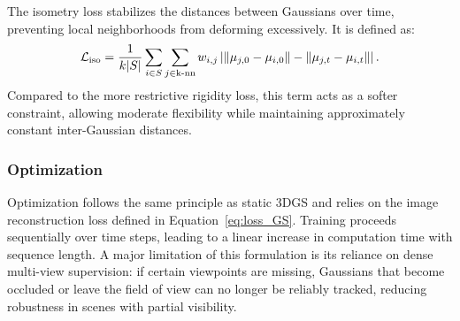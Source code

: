 The isometry loss stabilizes the distances between Gaussians over time, preventing local neighborhoods from deforming excessively. 
It is defined as:
\begin{align}
\mathcal{L}_{\mathrm{iso}} = \frac{1}{k|S|} \sum_{i \in S} \sum_{j \in \text{k-nn}} w_{i,j} \left| \|\mu_{j,0} - \mu_{i,0}\| - \|\mu_{j,t} - \mu_{i,t}\| \right|.
\end{align}
Compared to the more restrictive rigidity loss, this term acts as a softer constraint, allowing moderate flexibility while maintaining approximately constant inter-Gaussian distances.

\subsubsection{Optimization}

Optimization follows the same principle as static 3DGS and relies on the image reconstruction loss defined in Equation~\ref{eq:loss_GS}. 
Training proceeds sequentially over time steps, leading to a linear increase in computation time with sequence length. 
A major limitation of this formulation is its reliance on dense multi-view supervision: 
if certain viewpoints are missing, Gaussians that become occluded or leave the field of view can no longer be reliably tracked, reducing robustness in scenes with partial visibility.
